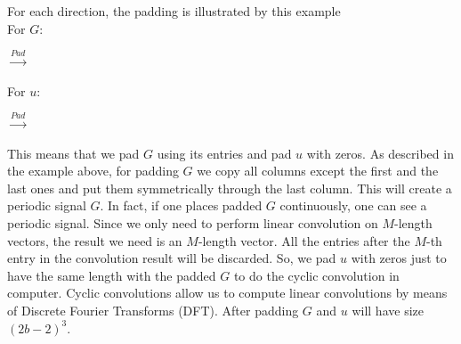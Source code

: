 \documentclass{wap}
\begin{document}
For each direction, the padding is illustrated by this example \\
For $G$:
\begin{center}
\quad$\xrightarrow{Pad}$\quad
{}
\end{center}
For $u$:
\begin{center}
\quad$\xrightarrow{Pad}$\quad
{}
\end{center}

This means that we pad $G$ using its entries and pad $u$ with zeros. As described in the example above, for padding $G$ we copy all columns except the first and the last ones and put them symmetrically through the last column. This will create a periodic signal $G$. In fact, if one places padded $G$ continuously, one can see a periodic signal. Since we only need to perform linear convolution on $M$-length vectors, the result we need is an $M$-length vector. All the entries after the $M$-th entry in the convolution result will be discarded. So, we pad $u$ with zeros just to have the same length with the padded $G$ to do the cyclic convolution in computer. Cyclic convolutions allow us to compute linear convolutions by means of Discrete Fourier Transforms (DFT). After padding $G$ and $u$ will have size $(2b-2)^3$.
\end{document}
